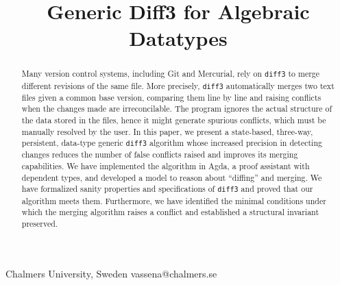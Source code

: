\documentclass{sigplanconf}
\theoremstyle{plain}
\begin{document}
\toappear{}
\setlength{\pdfpageheight}{\paperheight}
\setlength{\pdfpagewidth}{\paperwidth}






\title{Generic Diff3 for Algebraic Datatypes}

           {Chalmers University, Sweden}
           {vassena@chalmers.se}

\maketitle

\begin{abstract}
  Many version control systems, including Git and Mercurial, rely on
  \texttt{diff3} to merge different revisions of the same file.
  More precisely, \texttt{diff3} automatically merges two text files
  given a common base version, comparing them line by line and raising
  conflicts when the changes made are irreconcilable.
  The program ignores the actual structure of the data stored in the
  files, hence it might generate spurious conflicts, which must be
  manually resolved by the user.
  In this paper, we present a state-based, three-way, persistent,
  data-type generic \texttt{diff3} algorithm whose increased precision
  in detecting changes reduces the number of false conflicts raised
  and improves its merging capabilities.
  We have implemented the algorithm in Agda, a proof assistant with
  dependent types, and developed a model to reason about ``diffing''
  and merging.
  We have formalized sanity properties and specifications of
  \texttt{diff3} and proved that our algorithm meets them.
  Furthermore, we have identified the minimal conditions under which
  the merging algorithm raises a conflict and established a structural
  invariant preserved.
\end{abstract}
\end{document}
